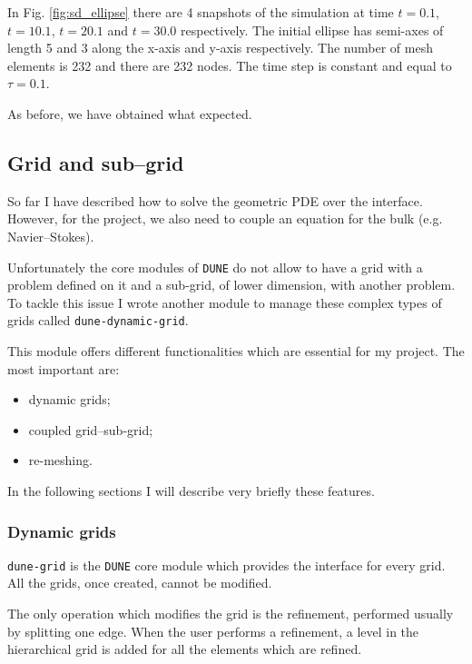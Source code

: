 \documentclass[a4paper,11pt, onecolumn]{article}
\begin{document}
\noindent In Fig. \ref{fig:sd_ellipse} there are 4 snapshots of the simulation at time $t=0.1$, $t=10.1$, $t=20.1$ and $t=30.0$ respectively. The initial ellipse has semi-axes of length 5 and 3 along the x-axis and y-axis respectively. The number of mesh elements is 232 and there are 232 nodes. The time step is constant and equal to $\tau=0.1$.
\newline

\noindent As before, we have obtained what expected.

\subsection{Grid and sub--grid}

So far I have described how to solve the geometric PDE over the interface. However, for the project, we also need to couple an equation for the bulk (e.g. Navier--Stokes).

\noindent Unfortunately the core modules of \verb|DUNE| do not allow to have a grid with a problem defined on it and a sub-grid, of lower dimension, with another problem. To tackle this issue I wrote another module to manage these complex types of grids called \verb|dune-dynamic-grid|.
\newline

\noindent This module offers different functionalities which are essential for my project. The most important are:
\begin{itemize}
 \item dynamic grids;
 \item coupled grid--sub-grid;
 \item re-meshing.
\end{itemize}

\noindent In the following sections I will describe very briefly these features.

\subsubsection{Dynamic grids}

\verb|dune-grid| is the \verb|DUNE| core module which provides the interface for every grid. All the grids, once created, cannot be modified. 

\noindent The only operation which modifies the grid is the refinement, performed usually by splitting one edge. When the user performs a refinement, a level in the hierarchical grid is added for all the elements which are refined.
\newline
\end{document}

